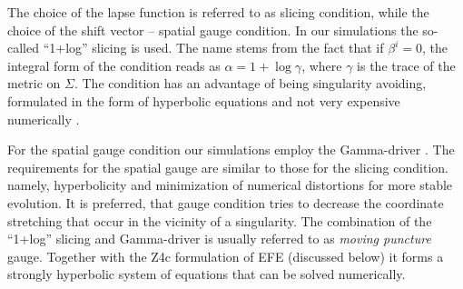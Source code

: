 %
The choice of the lapse function is referred to as slicing condition, 
while the choice of the shift vector -- spatial gauge condition. 
In our simulations the so-called ``1+log'' slicing is used. %
%
The name stems from the fact that if $\beta^i = 0$, 
the integral form of the condition reads as $\alpha = 1 + \log \gamma$, 
where $\gamma$ is the trace of the metric on $\Sigma$.
%
The condition has an advantage of being singularity avoiding, 
formulated in the form of hyperbolic equations and not very 
expensive numerically \citep{Alcubierre:2002kk}.


For the spatial gauge condition our simulations employ the Gamma-driver 
\citep{Alcubierre:2002kk,vanMeter:2006vi}.
The requirements for the spatial gauge are similar to those for 
the slicing condition. 
namely, hyperbolicity and minimization of numerical distortions for more stable evolution. 
It is preferred, that  gauge condition tries to decrease the coordinate stretching that occur in the 
vicinity of a singularity. 
%
The combination of the ``1+log'' slicing and Gamma-driver 
is usually referred to as \textit{moving puncture} gauge.
Together with the Z4c formulation of \ac{EFE} (discussed below) 
it forms a strongly hyperbolic system of equations that can be solved numerically.
%


